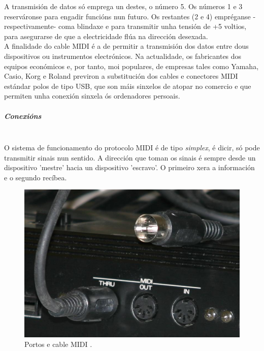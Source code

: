     A transmisión de datos só emprega un destes, o número 5. Os números 1 e 3
    reserváronse para engadir funcións nun futuro. Os restantes (2 e 4)
    empréganse -respectivamente- coma blindaxe e para transmitir unha tensión
    de +5 voltios, para asegurarse de que a electricidade flúa na dirección
    desexada. \\

    A finalidade do cable MIDI é a de permitir a transmisión dos datos entre
    dous dispositivos ou instrumentos electrónicos. Na actualidade, os
    fabricantes dos equipos económicos e, por tanto, moi populares, de empresas
    tales como Yamaha, Casio, Korg e Roland previron a substitución dos cables
    e conectores MIDI estándar polos de tipo USB, que son máis sinxelos de
    atopar no comercio e que permiten unha conexión sinxela ós ordenadores
    persoais.

    \subparagraph{Conexións}\mbox{}\\

    O sistema de funcionamento do protocolo MIDI é de tipo \textit{simplex}, é
    dicir, só pode transmitir sinais nun sentido. A dirección que toman os
    sinais é sempre desde un dispositivo 'mestre' hacia un dispositivo
    'escravo'. O primeiro xera a información e o segundo recíbea.

    \begin{figure}[htbp]
     \centering
     \includegraphics[scale=0.3,keepaspectratio=true]{./imagenes/wikipedia-puertos-midi.jpg}
     \caption[Portos e cable MIDI]{Portos e cable MIDI \cite{WikipediaMIDI}.}
     \label{figura:WikipediaPortosMIDI}
    \end{figure}

